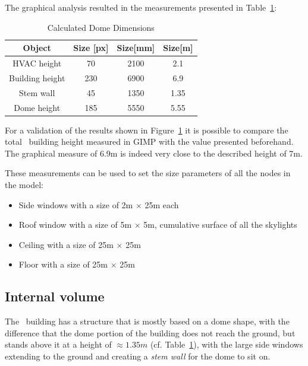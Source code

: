 The graphical analysis resulted in the measurements presented in
Table~\ref{tab:GIMP_measurements}:

\begin{table}[ht]
\centering
    \begin{tabular}{||c c c c||}
        \hline
        Object & Size [px] & Size[mm] & Size[m]\\
        \hline \hline
        HVAC height & 70 & 2100 & 2.1 \\
        Building height & 230 & 6900 & 6.9 \\
        Stem wall & 45 & 1350 & 1.35 \\
        Dome height & 185 & 5550 & 5.55 \\
        \hline
    \end{tabular}
\caption{Calculated Dome Dimensions}
\label{tab:GIMP_measurements}
\end{table}

For a validation of the results shown in Figure~\ref{tab:GIMP_measurements} it
is possible to compare the total \pdome\ building height measured in GIMP with
the value presented beforehand. The graphical measure of 6.9m is indeed very
close to the described height of 7m.

These measurements can be used to set the size parameters of all the nodes in
the model:

\begin{itemize}
    \item Side windows with a size of 2m $\times$ 25m each
    \item Roof window with a size of 5m $\times$ 5m, cumulative surface of all
        the skylights
    \item Ceiling with a size of 25m $\times$ 25m
    \item Floor with a size of 25m $\times$ 25m
\end{itemize}

\subsection{Internal volume}

The \pdome\ building has a structure that is mostly based on a dome shape, with
the difference that the dome portion of the building does not reach the ground,
but stands above it at a height of $\approx 1.35m$ (cf.
Table~\ref{tab:GIMP_measurements}), with the large side windows extending to the
ground and creating a \textit{stem wall} for the dome to sit on.

